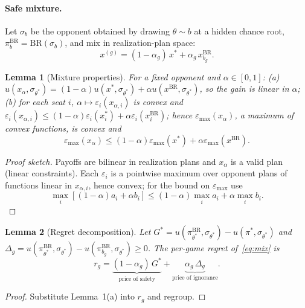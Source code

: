\documentclass[11pt]{article}
\newtheorem{lemma}{Lemma}
\newcommand{\eps}{\varepsilon}
\newcommand{\emax}{\eps_{\max}}
\newcommand{\BR}{\mathrm{BR}}
\begin{document}
\paragraph{Safe mixture.} Let $\sigma_b$ be the opponent obtained by drawing $\theta\sim b$ at a hidden chance root, $\pi^{\BR}_b=\BR(\sigma_b)$, and mix in realization-plan space:
\begin{equation}\label{eq:mix}
x^{(g)}=(1-\alpha_g)\,x^*+\alpha_g\,x^{\BR}_{b_g}.
\end{equation}
\begin{lemma}[Mixture properties]
For a fixed opponent and $\alpha\in[0,1]$: (a) $u(x_\alpha,\sigma_{\theta^*})=(1-\alpha)u(x^*,\sigma_{\theta^*})+\alpha u(x^{\BR},\sigma_{\theta^*})$, so the gain is linear in $\alpha$; (b) for each seat $i$, $\alpha\mapsto\eps_i(x_{\alpha,i})$ is convex and $\eps_i(x_{\alpha,i})\le(1-\alpha)\eps_i(x^*_i)+\alpha\eps_i(x^{\BR}_i)$; hence $\emax(x_\alpha)$, a maximum of convex functions, is convex and\[\emax(x_\alpha)\le(1-\alpha)\emax(x^*)+\alpha\emax(x^{\BR}).\]
\end{lemma}
\begin{proof}[Proof sketch] Payoffs are bilinear in realization plans and $x_\alpha$ is a valid plan (linear constraints). Each $\eps_i$ is a pointwise maximum over opponent plans of functions linear in $x_{\alpha,i}$, hence convex; for the bound on $\emax$ use\[\textstyle\max_i[(1-\alpha)a_i+\alpha b_i]\le(1-\alpha)\max_i a_i+\alpha\max_i b_i.\]\end{proof}
\begin{lemma}[Regret decomposition]
Let $G^*=u(\pi^{\BR}_{\theta^*},\sigma_{\theta^*})-u(\pi^*,\sigma_{\theta^*})$ and $\Delta_g=u(\pi^{\BR}_{\theta^*},\sigma_{\theta^*})-u(\pi^{\BR}_{b_g},\sigma_{\theta^*})\ge0$. The per-game regret of~\eqref{eq:mix} is
\[r_g=\underbrace{(1-\alpha_g)\,G^*}_{\text{price of safety}}+\underbrace{\alpha_g\,\Delta_g}_{\text{price of ignorance}}.\]
\end{lemma}
\begin{proof} Substitute Lemma~1(a) into $r_g$ and regroup.\end{proof}
\end{document}
